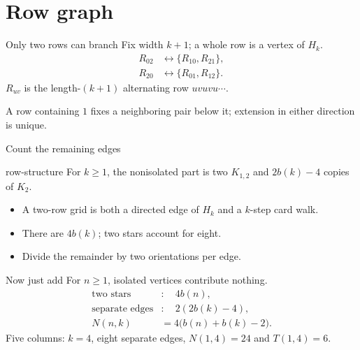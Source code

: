 \documentclass{beamer}
\begin{document}
\section{Row graph}
\begin{frame}{Only two rows can branch}
Fix width $k+1$; a whole row is a vertex of $H_k$.
\[
\begin{aligned}
R_{02}&\longleftrightarrow\{R_{10},R_{21}\},\\
R_{20}&\longleftrightarrow\{R_{01},R_{12}\}.
\end{aligned}
\]
$R_{uv}$ is the length-$(k+1)$ alternating row $uvuvu\cdots$.
\medskip

A row containing $1$ fixes a neighboring pair below it; extension in either direction is unique.
\end{frame}
\begin{frame}{Count the remaining edges}
\begin{bookresult}{row-structure}
For $k\geq1$, the nonisolated part is two $K_{1,2}$ and $2b(k)-4$ copies of $K_2$.
\end{bookresult}
\begin{itemize}
\item A two-row grid is both a directed edge of $H_k$ and a $k$-step card walk.
\item There are $4b(k)$; two stars account for eight.
\item Divide the remainder by two orientations per edge.
\end{itemize}
\end{frame}
\begin{frame}{Now just add}
For $n\geq1$, isolated vertices contribute nothing.
\[
\begin{aligned}
\text{two stars}&:\quad4b(n),\\
\text{separate edges}&:\quad2(2b(k)-4),\\
N(n,k)&=4\bigl(b(n)+b(k)-2\bigr).
\end{aligned}
\]
Five columns: $k=4$, eight separate edges, $N(1,4)=24$ and $T(1,4)=6$.
\end{frame}
\end{document}
